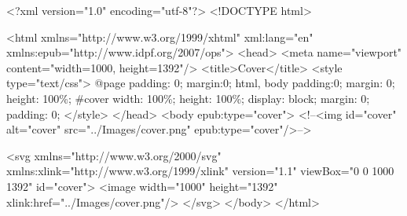 <?xml version="1.0" encoding="utf-8"?>
<!DOCTYPE html>

<html xmlns="http://www.w3.org/1999/xhtml" xml:lang="en" xmlns:epub="http://www.idpf.org/2007/ops">
<head>
	<meta name="viewport" content="width=1000, height=1392"/>
	<title>Cover</title>
	<style type="text/css">
		@page {padding: 0; margin:0;}
		html, body {
			padding:0;
			margin: 0;
			height: 100\%;
		}
		\#cover {
			width: 100\%;
			height: 100\%;
			display: block;
			margin: 0;
			padding: 0;
		}
	</style>
</head>
<body epub:type="cover">
	<!--<img id="cover" alt="cover" src="../Images/cover.png" epub:type="cover"/>-->

<svg xmlns="http://www.w3.org/2000/svg" xmlns:xlink="http://www.w3.org/1999/xlink" version="1.1" viewBox="0 0 1000 1392" id="cover">
	<image width="1000" height="1392" xlink:href="../Images/cover.png"/>
</svg>
</body>
</html>